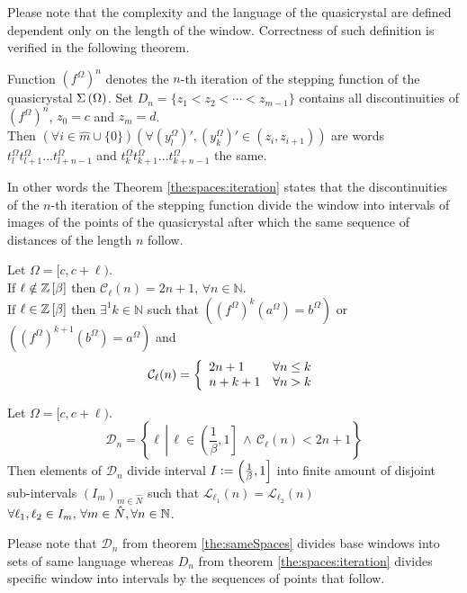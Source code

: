 \documentclass[text.tex]{subfiles}
\begin{document}
\begin{remark}
Please note that the complexity and the language of the quasicrystal are defined dependent only on the length of the window. Correctness of such definition is verified in the following theorem.
\end{remark}

\begin{theorem}
\label{the:spaces:iteration}
Function ${(f^\Omega)}^n$ denotes the $n$-th iteration of the stepping function of the quasicrystal $\Sigma\left(\Omega\right)$. Set $D_n = \{z_1 < z_2 < \dotsb < z_{m-1}\}$ contains all discontinuities of ${(f^\Omega)}^n$, $z_0 = c$ and $z_m = d$.\\
Then $(\forall i \in \widehat{m}\cup\{0\})(\forall {\left(y_l^\Omega\right)}' ,{\left(y_k^\Omega\right)}' \in (z_i, z_{i+1}))$ are words $t_l^\Omega t_{l+1}^\Omega \dotso t_{l+n-1}^\Omega$ and $t_k^\Omega t_{k+1}^\Omega \dotso t_{k+n-1}^\Omega$ the same.
\end{theorem}

\begin{remark}
In other words the Theorem \ref{the:spaces:iteration} states that the discontinuities of the $n$-th iteration of the stepping function divide the window into intervals of images of the points of the quasicrystal after which the same sequence of distances of the length $n$ follow.
\end{remark}

\begin{theorem}
\label{the:complexity}
Let $\Omega = [c,c+\ell)$.\\
If $\ell \notin \mathbb{Z}\left[\beta\right]$ then $\mathcal{C}_{\ell}(n) = 2n+1,\, \forall n\in\mathbb{N}$. \\
If $\ell \in \mathbb{Z}\left[\beta\right]$ then $\exists^1 k \in \mathbb{N}$ such that $\left({(f^\Omega)}^{k}(a^\Omega) = b^\Omega\right)$ or $\left({(f^\Omega)}^{k+1}(b^\Omega) = a^\Omega\right)$ and 
$$\mathcal{C}_{\ell}(n) = \left\{
	\begin{array}{l l}
		2n+1	&	\forall n\leq k \\
		n+k+1	&	\forall n > k
	\end{array}
	\right.
$$
\end{theorem}

\begin{theorem}
\label{the:sameSpaces}
Let $\Omega = [c,c+\ell)$.
$$\mathcal{D}_n = \left\{ \ell\,\left|\, \ell\in \left(\frac{1}{\beta},1\right] \,\wedge\, \mathcal{C}_\ell(n) < 2n+1 \right.\right\}$$
Then elements of $\mathcal{D}_n$ divide interval $I \vcentcolon= \left(\frac{1}{\beta},1\right]$ into finite amount of disjoint sub-intervals $(I_m)_{m\in\hat{N}}$ such that $\mathcal{L}_{\ell_1}(n) = \mathcal{L}_{\ell_2}(n)$ $\forall \ell_1, \ell_2 \in I_m,\, \forall m\in\hat{N}, \forall n\in\mathbb{N}$.
\end{theorem}

\begin{remark}
Please note that $\mathcal{D}_n$ from theorem \ref{the:sameSpaces} divides base windows into sets of same language whereas $D_n$ from theorem \ref{the:spaces:iteration} divides specific window into intervals by the sequences of points that follow.
\end{remark}
\end{document}

